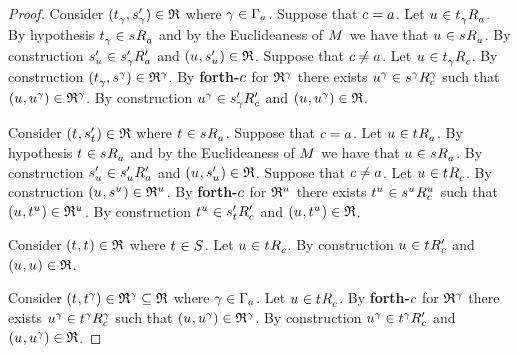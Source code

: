 \begin{proof}
Consider $(\kStateT_\gamma, \kStateSP_\gamma) \in \refinement$ where $\gamma \in \Gamma_\agentA$.
Suppose that $\agentC = \agentA$.
Let $\kStateU \in \kSuccessorsA{\kStateT_\gamma}$.
By hypothesis $\kStateT_\gamma \in \kSuccessorsA{\kStateS}$ and by the Euclideaness of $\kModel$ we have that $\kStateU \in \kSuccessorsA{\kStateS}$.
By construction $\kStateSP_{\kStateU} \in \kSuccessorsPA{\kStateSP_\gamma}$ and $(\kStateU, \kStateSP_{\kStateU}) \in \refinement$.
Suppose that $\agentC \neq \agentA$.
Let $\kStateU \in \kSuccessorsC{\kStateT_\gamma}$.
By construction $(\kStateT_\gamma, \kStateS[\gamma]) \in \refinement^\gamma$.
By {\bf forth-$\agentC$} for $\refinement^\gamma$ there exists $\kStateU[\gamma] \in \kSuccessorsC[\gamma]{\kStateS[\gamma]}$ such that $(\kStateU, \kStateU[\gamma]) \in \refinement^\gamma$.
By construction $\kStateU[\gamma] \in \kSuccessorsPC{\kStateSP_\gamma}$ and $(\kStateU, \kStateU[\gamma]) \in \refinement$.

Consider $(\kStateT, \kStateSP_{\kStateT}) \in \refinement$ where $\kStateT \in \kSuccessorsA{\kStateS}$.
Suppose that $\agentC = \agentA$.
Let $\kStateU \in \kSuccessorsA{\kStateT}$.
By hypothesis $\kStateT \in \kSuccessorsA{\kStateS}$ and by the Euclideaness of $\kModel$ we have that $\kStateU \in \kSuccessorsA{\kStateS}$.
By construction $\kStateSP_{\kStateU} \in \kSuccessorsPA{\kStateSP_{\kStateU}}$ and $(\kStateU, \kStateSP_{\kStateU}) \in \refinement$.
Suppose that $\agentC \neq \agentA$.
Let $\kStateU \in \kSuccessorsC{\kStateT}$.
By construction $(\kStateU, \kStateS[\kStateU]) \in \refinement^{\kStateU}$.
By {\bf forth-$\agentC$} for $\refinement^{\kStateU}$ there exists $\kStateT[\kStateU] \in \kSuccessorsC[\kStateU]{\kStateS[\kStateU]}$ such that $(\kStateU, \kStateT[\kStateU]) \in \refinement^{\kStateU}$.
By construction $\kStateT[\kStateU] \in \kSuccessorsPC{\kStateSP_{\kStateT}}$ and $(\kStateU, \kStateT[\kStateU]) \in \refinement$.

Consider $(\kStateT, \kStateT) \in \refinement$ where $\kStateT \in \kStates$.
Let $\kStateU \in \kSuccessorsC{\kStateT}$.
By construction $\kStateU \in \kSuccessorsPC{\kStateT}$ and $(\kStateU, \kStateU) \in \refinement$.

Consider $(\kStateT, \kStateT[\gamma]) \in \refinement^\gamma \subseteq \refinement$ where $\gamma \in \Gamma_\agentA$.
Let $\kStateU \in \kSuccessorsC{\kStateT}$.
By {\bf forth-$\agentC$} for $\refinement^\gamma$ there exists $\kStateU[\gamma] \in \kSuccessorsC[\gamma]{\kStateT[\gamma]}$ such that $(\kStateU, \kStateU[\gamma]) \in \refinement^\gamma$.
By construction $\kStateU[\gamma] \in \kSuccessorsPC{\kStateT[\gamma]}$ and $(\kStateU, \kStateU[\gamma]) \in \refinement$.


\end{proof}
